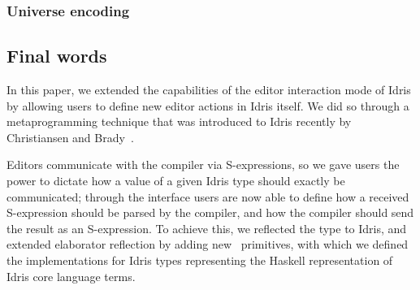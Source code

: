 


\subsubsection{Universe encoding}
\label{sssec:universeEncoding}


\subsection{Final words}

In this paper, we extended the capabilities of the editor interaction mode of
Idris by allowing users to define new editor actions in Idris itself. We did
so through a metaprogramming technique that was introduced to Idris recently by
Christiansen and Brady~\cite{elabref}.

Editors communicate with the compiler via S-expressions, so we gave users the
power to dictate how a value of a given Idris type should exactly be
communicated; through the  interface users are now able to
define how a received S-expression should be parsed by the compiler, and how
the compiler should send the result as an S-expression. To achieve this, we
reflected the  type to Idris, and extended elaborator reflection
by adding new \Elab\ primitives, with which we defined the 
implementations for Idris types representing the Haskell representation of
Idris core language terms.

